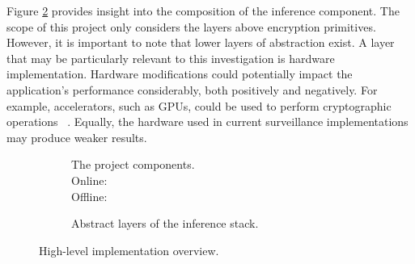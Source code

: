 \indent \indent
Figure \ref{fig:abstractInference} provides insight into the composition of the inference component. The scope of this project only considers the layers above encryption primitives. However, it is important to note that lower layers of abstraction exist. A layer that may be particularly relevant to this investigation is hardware implementation. Hardware modifications could potentially impact the application's performance considerably, both positively and negatively. For example, accelerators, such as GPUs, could be used to perform cryptographic operations ~\cite{Badawi}. Equally, the hardware used in current surveillance implementations may produce weaker results.
\begin{figure}[ht]
    \begin{subfigure}[b]{0.5\textwidth}
        \centering
        \scalebox{0.5}{}
        \captionsetup{justification=centering}
        \caption[Project Components]{The project components.\medskip\\Online: \hl{\quad\quad\quad\quad}\smallskip\\Offline: \hl{\quad\quad\quad\quad}}
        \label{fig:abstractNetwork}
    \end{subfigure}%
    \begin{subfigure}[b]{0.5\textwidth}
        \centering
        \scalebox{0.7}{}
        \caption{Abstract layers of the inference stack.}
        \label{fig:abstractInference}
    \end{subfigure}%
    \caption{High-level implementation overview.}
    \label{fig:abstraction}
\end{figure}

\setlength{\leftskip}{0cm}
